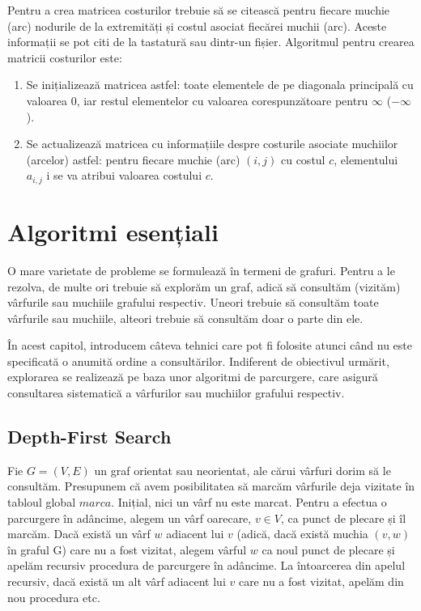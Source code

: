 \documentclass[9pt,a4paper]{report}
\begin{document}
Pentru a crea matricea costurilor trebuie să se citească pentru fiecare muchie (arc) nodurile de la extremități și costul asociat fiecărei muchii (arc). Aceste informații se pot citi de la tastatură sau dintr-un fișier. Algoritmul pentru crearea matricii costurilor este:

\begin{enumerate}
    \item Se inițializează matricea astfel: toate elementele de pe diagonala principală cu valoarea 0, iar restul elementelor cu valoarea corespunzătoare pentru $\infty$ ($-\infty$).
    \item Se actualizează matricea cu informațiile despre costurile asociate muchiilor (arcelor) astfel: pentru fiecare muchie (arc) $(i,j)$ cu costul $c$, elementului $a_{i,j}$ i se va atribui valoarea costului $c$.
\end{enumerate}

\chapter{Algoritmi esențiali}

O mare varietate de probleme se formulează în termeni de grafuri. Pentru a le rezolva, de multe ori trebuie să explorăm un graf, adică să consultăm (vizităm) vârfurile sau muchiile grafului respectiv. Uneori trebuie să consultăm toate vârfurile sau muchiile, alteori trebuie să consultăm doar o parte din ele. 

În acest capitol, introducem câteva tehnici care pot fi folosite atunci când nu este specificată o anumită ordine a consultărilor. Indiferent de obiectivul urmărit, explorarea se realizează pe baza unor algoritmi de parcurgere, care asigură consultarea sistematică a vârfurilor sau muchiilor grafului respectiv.

\section{Depth-First Search}

Fie $G = (V, E)$ un graf orientat sau neorientat, ale cărui vârfuri dorim să le consultăm. Presupunem că avem posibilitatea să marcăm vârfurile deja vizitate în tabloul global $marca$. Inițial, nici un vârf nu este marcat.
Pentru a efectua o parcurgere în adâncime, alegem un vârf oarecare, $v \in V$, ca punct de plecare și îl marcăm. Dacă există un vârf $w$ adiacent lui $v$ (adică, dacă există muchia $(v, w)$ în graful G) care nu a fost vizitat, alegem vârful $w$ ca noul punct de plecare și apelăm recursiv procedura de parcurgere în adâncime. La întoarcerea din apelul recursiv, dacă există un alt vârf adiacent lui $v$ care nu a fost vizitat, apelăm din nou procedura etc. 
\end{document}
